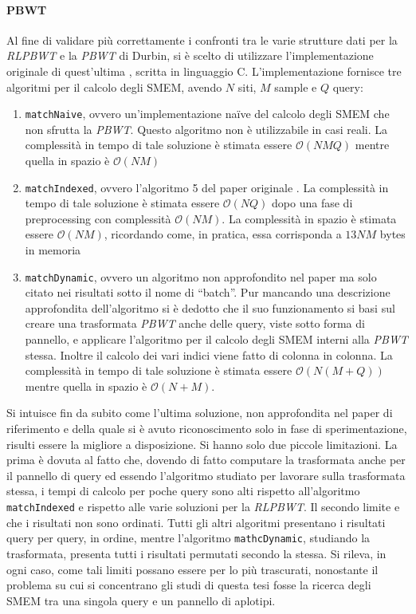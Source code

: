 \paragraph{PBWT}
Al fine di validare più correttamente i confronti tra le varie strutture dati
per la \textit{RLPBWT} e la \textit{PBWT} di Durbin, si è scelto di utilizzare
l'implementazione originale di quest'ultima \cite{durbin_gh}, scritta in
linguaggio C. L'implementazione
fornisce tre algoritmi per il calcolo degli SMEM, avendo $N$ siti, $M$ sample e
$Q$ query:
\begin{enumerate}
  \item \texttt{matchNaive}, ovvero un'implementazione na\"{i}ve del calcolo
  degli SMEM che non sfrutta la \textit{PBWT}. Questo algoritmo non è
  utilizzabile in casi reali. La complessità in tempo di tale 
  soluzione è stimata essere $\mathcal{O}(NMQ)$ mentre quella in spazio è
  $\mathcal{O}(NM)$
  \item \texttt{matchIndexed}, ovvero l'algoritmo 5 del paper originale
  \cite{pbwt}. La complessità in tempo di tale 
  soluzione è stimata essere $\mathcal{O}(NQ)$ dopo una fase di preprocessing
  con complessità $\mathcal{O}(NM)$. La complessità in spazio è stimata essere
  $\mathcal{O}(NM)$, ricordando come, in pratica, essa corrisponda a $13NM$
  bytes in memoria
  \item \texttt{matchDynamic}, ovvero un algoritmo non approfondito nel paper ma
  solo citato nei risultati sotto il nome di ``batch''. Pur mancando una
  descrizione approfondita dell'algoritmo si è dedotto che il suo funzionamento
  si basi sul creare una trasformata \textit{PBWT} anche delle query, viste
  sotto forma di pannello, e applicare l'algoritmo per il calcolo degli SMEM
  interni alla \textit{PBWT} stessa. Inoltre il calcolo dei vari indici viene
  fatto di colonna in colonna. La complessità in tempo di tale 
  soluzione è stimata essere $\mathcal{O}(N(M+Q))$ mentre quella in spazio è
  $\mathcal{O}(N+M)$. 
\end{enumerate}
Si intuisce fin da subito come l'ultima soluzione, non approfondita nel paper di
riferimento e della quale si è avuto riconoscimento solo in fase di
sperimentazione, risulti essere la migliore a disposizione. Si hanno solo due
piccole limitazioni. La prima è dovuta al fatto che, dovendo di fatto computare
la trasformata anche per il pannello di query ed essendo l'algoritmo studiato
per lavorare sulla trasformata stessa, i tempi di calcolo per poche query sono
alti rispetto all'algoritmo \texttt{matchIndexed} e rispetto alle varie
soluzioni per la \textit{RLPBWT}. Il secondo limite e che i risultati non sono
ordinati. Tutti gli altri algoritmi presentano i risultati query per query, in
ordine, mentre l'algoritmo \texttt{mathcDynamic}, studiando la trasformata,
presenta tutti i risultati permutati secondo la stessa. Si rileva, in ogni caso,
come tali limiti possano essere per lo più trascurati, nonostante il problema su
cui si concentrano gli studi di questa tesi fosse la ricerca degli SMEM tra una
singola query e un pannello di aplotipi.
